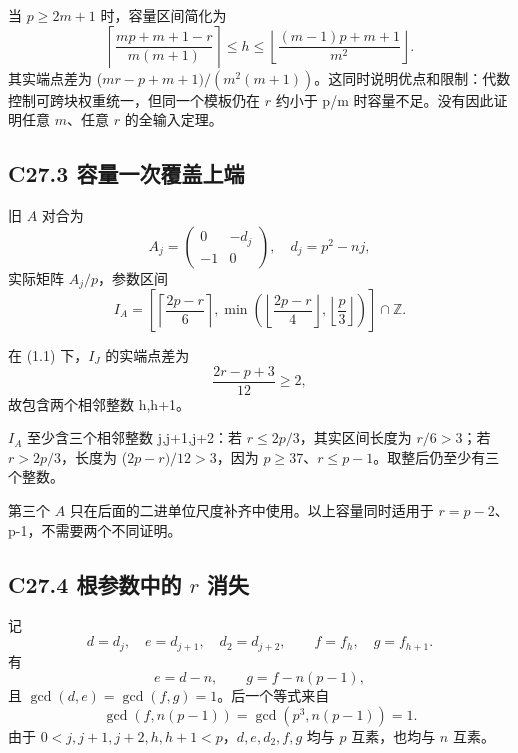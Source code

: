 {当} {\ensuremath{p\ge 2m+1}} {时，容量区间简化为} \[
\left\lceil\frac{mp+m+1-r}{m(m+1)}\right\rceil
\le h\le
\left\lfloor\frac{(m-1)p+m+1}{m^2}\right\rfloor.
\tag{C27.2.7}
\] {其实端点差为} {(\ensuremath{mr-p+m+1)/(m^{2}(m+1))}。这同时说明优点和限制：代数控制可跨块权重统一，但同一个模板仍在} {\ensuremath{r}} {约小于} {p/m} {时容量不足。没有因此证明任意} {\ensuremath{m}、任意} {\ensuremath{r}} {的全输入定理。}

\subsection*{\texorpdfstring{{C27.3} {容量一次覆盖上端}}{C27.3 容量一次覆盖上端}}\label{C27-h170}

{旧} {\ensuremath{A}} {对合为} \[
A_j=\begin{pmatrix}0&-d_j\\-1&0\end{pmatrix},
\quad d_j=p^2-nj,
\] {实际矩阵} {\ensuremath{A_{j}/p}，参数区间} \[
I_A=
\left[
\left\lceil\frac{2p-r}{6}\right\rceil,
\min\left(\left\lfloor\frac{2p-r}{4}\right\rfloor,
\left\lfloor\frac p3\right\rfloor\right)
\right]\cap\mathbb Z.
\]

{在} {(1.1)} {下，\ensuremath{I_{J}}} {的实端点差为} \[
\frac{2r-p+3}{12}\ge2,
\] {故包含两个相邻整数} {h,h+1。}

{\ensuremath{I_{A}}} {至少含三个相邻整数} {j,j+1,j+2：若} {\ensuremath{r\le 2p/3}，其实区间长度为} {\ensuremath{r/6>3}；若} {\ensuremath{r>2p/3}，长度为} {(\ensuremath{2p-r)/12>3}，因为} {\ensuremath{p\ge 37}、\ensuremath{r\le p-1}。取整后仍至少有三个整数。}

{第三个} {\ensuremath{A}} {只在后面的二进单位尺度补齐中使用。以上容量同时适用于} {\ensuremath{r=p-2}、p-1，不需要两个不同证明。}

\subsection*{\texorpdfstring{{C27.4} {根参数中的} {\ensuremath{r}} {消失}}{C27.4 根参数中的  消失}}\label{C27-h171}

{记} \[
d=d_j,\quad e=d_{j+1},\quad d_2=d_{j+2},\qquad
f=f_h,\quad g=f_{h+1}.
\] {有} \[
e=d-n,\qquad g=f-n(p-1),
\] {且} {\ensuremath{\operatorname{gcd}(d,e)=\operatorname{gcd}(f,g)=1}。后一个等式来自} \[
\gcd(f,n(p-1))=\gcd(p^3,n(p-1))=1.
\] {由于} {\ensuremath{0<j,j+1,j+2,h,h+1<p}，\ensuremath{d,e,d_{2},f,g}} {均与} {\ensuremath{p}} {互素，也均与} {\ensuremath{n}} {互素。}

